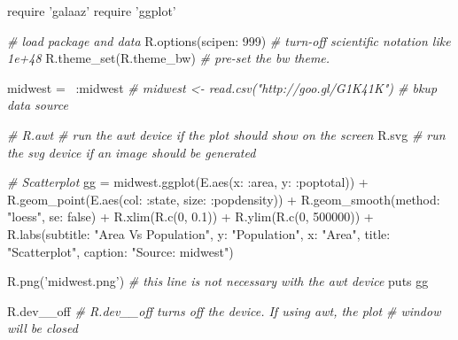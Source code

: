 \documentclass[11pt,]{article}
\newenvironment{Shaded}{\begin{snugshade}}{\end{snugshade}}
\newcommand{\DecValTok}[1]{\textcolor[rgb]{0.00,0.00,0.81}{#1}}
\newcommand{\FloatTok}[1]{\textcolor[rgb]{0.00,0.00,0.81}{#1}}
\newcommand{\StringTok}[1]{\textcolor[rgb]{0.31,0.60,0.02}{#1}}
\newcommand{\CommentTok}[1]{\textcolor[rgb]{0.56,0.35,0.01}{\textit{#1}}}
\newcommand{\NormalTok}[1]{#1}
\begin{document}
\begin{Shaded}
\begin{Highlighting}[]
\NormalTok{require }\StringTok{'galaaz'}
\NormalTok{require }\StringTok{'ggplot'}

\CommentTok{# load package and data}
\NormalTok{R.options(}\StringTok{scipen: }\DecValTok{999}\NormalTok{)  }\CommentTok{# turn-off scientific notation like 1e+48}
\NormalTok{R.theme_set(R.theme_bw)  }\CommentTok{# pre-set the bw theme.}

\NormalTok{midwest = ~}\StringTok{:midwest}
\CommentTok{# midwest <- read.csv("http://goo.gl/G1K41K")  # bkup data source}

\CommentTok{# R.awt  # run the awt device if the plot should show on the screen}
\NormalTok{R.svg    }\CommentTok{# run the svg device if an image should be generated}

\CommentTok{# Scatterplot}
\NormalTok{gg = midwest.ggplot(E.aes(}\StringTok{x: :area}\NormalTok{, }\StringTok{y: :poptotal}\NormalTok{)) + }
\NormalTok{     R.geom_point(E.aes(}\StringTok{col: :state}\NormalTok{, }\StringTok{size: :popdensity}\NormalTok{)) + }
\NormalTok{     R.geom_smooth(}\StringTok{method: "loess"}\NormalTok{, }\StringTok{se: }\DecValTok{false}\NormalTok{) + }
\NormalTok{     R.xlim(R.c(}\DecValTok{0}\NormalTok{, }\FloatTok{0.1}\NormalTok{)) + }
\NormalTok{     R.ylim(R.c(}\DecValTok{0}\NormalTok{, }\DecValTok{500000}\NormalTok{)) + }
\NormalTok{     R.labs(}\StringTok{subtitle: "Area Vs Population"}\NormalTok{, }
            \StringTok{y: "Population"}\NormalTok{, }
            \StringTok{x: "Area"}\NormalTok{, }
            \StringTok{title: "Scatterplot"}\NormalTok{, }
            \StringTok{caption: "Source: midwest"}\NormalTok{)}

\NormalTok{R.png(}\StringTok{'midwest.png'}\NormalTok{)     }\CommentTok{# this line is not necessary with the awt device}
\NormalTok{puts gg}

\NormalTok{R.dev__off               }\CommentTok{# R.dev__off turns off the device.  If using awt, the plot}
                         \CommentTok{# window will be closed}
\end{Highlighting}
\end{Shaded}
\end{document}
